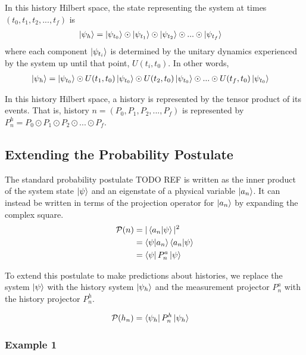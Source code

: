 In this history Hilbert space, the state representing the system at times $\left(t_0, t_1, t_2, ..., t_f \right)$ is
\begin{align}
  \ket{\psi_h} &= \ket{\psi_{t_0}} \odot \ket{\psi_{t_1}} \odot \ket{\psi_{t_2}} \odot ... \odot \ket{\psi_{t_f}}
\end{align}
where each component $\ket{\psi_{t_i}}$ is determined by the unitary dynamics experienced by the system up until that point, $U(t_i, t_0)$. In other words,
\begin{align}
  \ket{\psi_h} &= \ket{\psi_{t_0}} \odot U(t_1, t_0)\ket{\psi_{t_0}} \odot U(t_2, t_0)\ket{\psi_{t_0}} \odot ... \odot U(t_f, t_0)\ket{\psi_{t_0}}
\end{align}

In this history Hilbert space, a history is represented by the tensor product of its events. That is, history $n = \left( P_0, P_1, P_2, ... , P_f \right)$ is represented by $P^h_n = P_0 \odot P_1 \odot P_2 \odot ... \odot P_f $.

\subsection{Extending the Probability Postulate}
The standard probability postulate TODO REF is written as the inner product of the system state $\ket{\psi}$ and an eigenstate of a physical variable $\ket{a_n}$. It can instead be written in terms of the projection operator for $\ket{a_n}$ by expanding the complex square.
\begin{align}
        \mathcal{P}(n) &= |\braket{a_n|\psi}|^2 \\ \nonumber
        &= \braket{\psi|a_n} \braket{a_n|\psi} \\ \nonumber
        &= \bra{\psi} P^a_n \ket{\psi}
\end{align}

To extend this postulate to make predictions about histories, we replace the system $\ket{\psi}$ with the history system $\ket{\psi_h}$ and the measurement projector $P^a_n$ with the history projector $P^h_n$.

\begin{align}
    \mathcal{P}(h_n) &= \bra{\psi_h} P^h_n \ket{\psi_h}
\end{align}

\subsubsection{Example 1}

